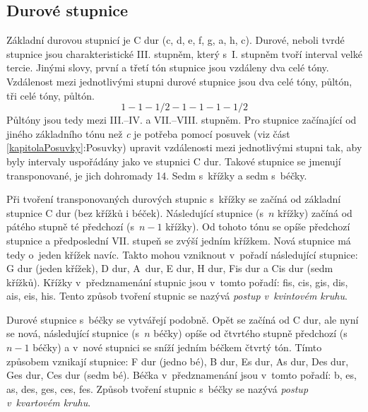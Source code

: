 \subsection{Durové stupnice}
Základní durovou stupnicí je C dur (c, d, e, f, g, a, h, c).
Durové, neboli tvrdé stupnice jsou charakteristické III. stupněm,
který s~I. stupněm tvoří interval velké tercie.
Jinými slovy, první a třetí tón stupnice jsou vzdáleny dva celé tóny.
Vzdálenost mezi jednotlivými stupni durové stupnice jsou dva celé tóny, 
půltón, tři celé tóny, půltón.
$$ 1 - 1 - 1/2 - 1 - 1 - 1 - 1/2 $$
Půltóny jsou tedy mezi III.--IV. a VII.--VIII. stupněm.
Pro stupnice začínající od jiného základního tónu než \emph{c} 
je potřeba pomocí posuvek (viz část \ref{kapitolaPosuvky}:Posuvky) 
upravit vzdálenosti mezi jednotlivými stupni tak,
aby byly intervaly uspořádány jako ve stupnici C dur.
Takové stupnice  se jmenují transponované, je jich dohromady 14.
Sedm s~křížky a sedm s~béčky.
\cite{kofron}
\par

Při tvoření transponovaných durových stupnic s~křížky 
se začíná od základní stupnice C dur (bez křížků i béček).
Následující stupnice (s~$n$ křížky) začíná od pátého stupně té předchozí (s~$n-1$ křížky).
Od tohoto tónu se opíše předchozí stupnice 
a předposlední VII. stupeň se zvýší jedním křížkem.
Nová stupnice má tedy o~jeden křížek navíc.
Takto mohou vzniknout v~pořadí následující stupnice: 
G dur (jeden křížek), D dur, A~dur, E dur, H dur, Fis dur a Cis dur (sedm křížků).
Křížky v~předznamenání stupnic jsou v~tomto pořadí:
fis, cis, gis, dis, ais, eis, his.
Tento způsob tvoření stupnic se nazývá \emph{postup v~kvintovém kruhu}.
\cite{kofron}
\par

Durové stupnice s~béčky se vytvářejí podobně.
Opět se začíná od C dur, ale nyní se nová, 
následující stupnice (s~$n$ béčky) opíše od čtvrtého stupně předchozí (s~$n-1$ béčky)
a v~nové stupnici se sníží jedním béčkem čtvrtý tón.
Tímto způsobem vznikají stupnice:
F dur (jedno bé), B dur, Es dur, As dur, Des dur, Ges dur, Ces dur (sedm bé).
Béčka v~předznamenání jsou v~tomto pořadí:
b, es, as, des, ges, ces, fes.
Způsob tvoření stupnic s~béčky se nazývá \emph{postup v~kvartovém kruhu}.
\cite{kofron}
\par

